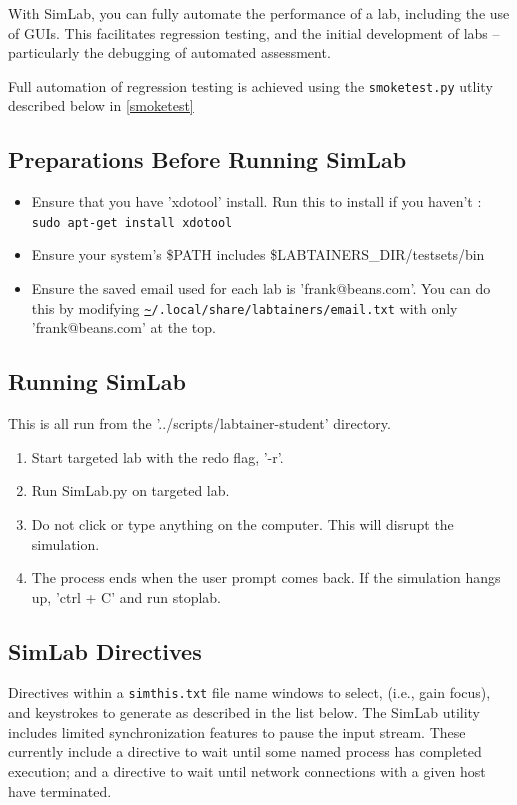 \documentclass[12pt]{article}
\begin{document}
With SimLab, you can fully automate the performance of a lab, including the use of GUIs.
This facilitates regression testing, and the initial development of labs -- particularly
the debugging of automated assessment.   

Full automation of regression testing is achieved using the {\tt smoketest.py} utlity
described below in \ref{smoketest}

\subsection {Preparations Before Running SimLab}
\begin{itemize}
	\item Ensure that you have 'xdotool' install. Run this to install if you haven't : \\ 
		{\tt sudo apt-get install xdotool}

	\item Ensure your system's \$PATH includes \$LABTAINERS\_DIR/testsets/bin 

	\item Ensure the saved email used for each lab is 'frank@beans.com'. You can do this by modifying {\tt \url{~}/.local/share/labtainers/email.txt} with only 'frank@beans.com' at the top. 
\end{itemize}

\subsection {Running SimLab}
This is all run from the '../scripts/labtainer-student' directory.
\begin{enumerate}
	\item Start targeted lab with the redo flag, '-r'.
	\item Run SimLab.py on targeted lab.
	\item Do not click or type anything on the computer. This will disrupt the simulation. 
	\item The process ends when the user prompt comes back. If the simulation hangs up, 'ctrl + C' and run stoplab.
\end{enumerate}


\subsection {SimLab Directives}
Directives within a {\tt simthis.txt} file name windows to select, (i.e., gain focus),
and keystrokes to generate as described in the list below.  The SimLab utility includes
limited synchronization features to pause the input stream.  These currently include a
directive to wait until some named process has completed execution; and a directive to wait
until network connections with a given host have terminated.
\end{document}
